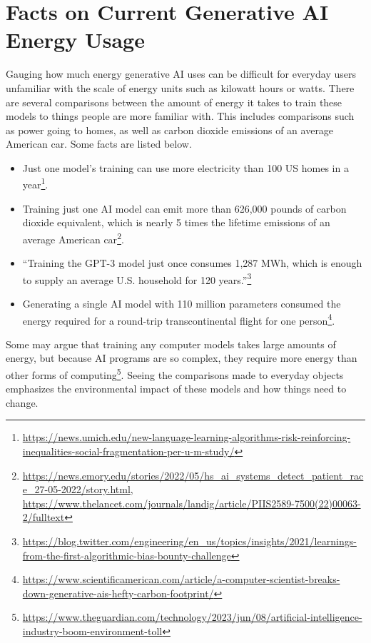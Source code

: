 \documentclass[
]{book}
\begin{document}
\hypertarget{facts-on-current-generative-ai-energy-usage}{%
\section{Facts on Current Generative AI Energy Usage}\label{facts-on-current-generative-ai-energy-usage}}

Gauging how much energy generative AI uses can be difficult for everyday users unfamiliar with the scale of energy units such as kilowatt hours or watts. There are several comparisons between the amount of energy it takes to train these models to things people are more familiar with. This includes comparisons such as power going to homes, as well as carbon dioxide emissions of an average American car. Some facts are listed below.

\begin{itemize}
\item
  Just one model's training can use more electricity than 100 US homes in a year\footnote{\url{https://news.umich.edu/new-language-learning-algorithms-risk-reinforcing-inequalities-social-fragmentation-per-u-m-study/}}.
\item
  Training just one AI model can emit more than 626,000 pounds of carbon dioxide equivalent, which is nearly 5 times the lifetime emissions of an average American car\footnote{\url{https://news.emory.edu/stories/2022/05/hs_ai_systems_detect_patient_race_27-05-2022/story.html}, \url{https://www.thelancet.com/journals/landig/article/PIIS2589-7500(22)00063-2/fulltext}}.
\item
  ``Training the GPT-3 model just once consumes 1,287 MWh, which is enough to supply an average U.S. household for 120 years.''\footnote{\url{https://blog.twitter.com/engineering/en_us/topics/insights/2021/learnings-from-the-first-algorithmic-bias-bounty-challenge}}
\item
  Generating a single AI model with 110 million parameters consumed the energy required for a round-trip transcontinental flight for one person\footnote{\url{https://www.scientificamerican.com/article/a-computer-scientist-breaks-down-generative-ais-hefty-carbon-footprint/}}.
\end{itemize}

Some may argue that training any computer models takes large amounts of energy, but because AI programs are so complex, they require more energy than other forms of computing\footnote{\url{https://www.theguardian.com/technology/2023/jun/08/artificial-intelligence-industry-boom-environment-toll}}. Seeing the comparisons made to everyday objects emphasizes the environmental impact of these models and how things need to change.
\end{document}
